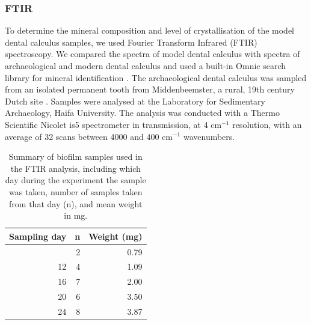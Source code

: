 \documentclass[10pt,a4paper]{article}
\begin{document}
\subsubsection{FTIR}\label{ftir}

To determine the mineral composition and level of crystallisation of the
model dental calculus samples, we used Fourier Transform Infrared (FTIR)
spectroscopy. We compared the spectra of model dental calculus with
spectra of archaeological and modern dental calculus and used a built-in
Omnic search library for mineral identification
\citep{weinerInfraredSpectroscopy2010, mentzerDistributionAuthigenic2014}.
The archaeological dental calculus was sampled from an isolated
permanent tooth from Middenbeemster, a rural, 19th century Dutch site
\citep{lemmersMiddenbeemster2013}. Samples were analysed at the
Laboratory for Sedimentary Archaeology, Haifa University. The analysis
was conducted with a Thermo Scientific Nicolet is5 spectrometer in
transmission, at 4 cm\(^{-1}\) resolution, with an average of 32 scans
between 4000 and 400 cm\(^{-1}\) wavenumbers.

\begin{longtable}[]{@{}rrr@{}}

\caption{\label{tbl-ftir-byoc}Summary of biofilm samples used in the
FTIR analysis, including which day during the experiment the sample was
taken, number of samples taken from that day (n), and mean weight in
mg.}

\tabularnewline

\toprule\noalign{}
Sampling day & n & Weight (mg) \\
\midrule\noalign{}
\endhead
\bottomrule\noalign{}
\endlastfoot
7 & 2 & 0.79 \\
12 & 4 & 1.09 \\
16 & 7 & 2.00 \\
20 & 6 & 3.50 \\
24 & 8 & 3.87 \\

\end{longtable}
\end{document}
